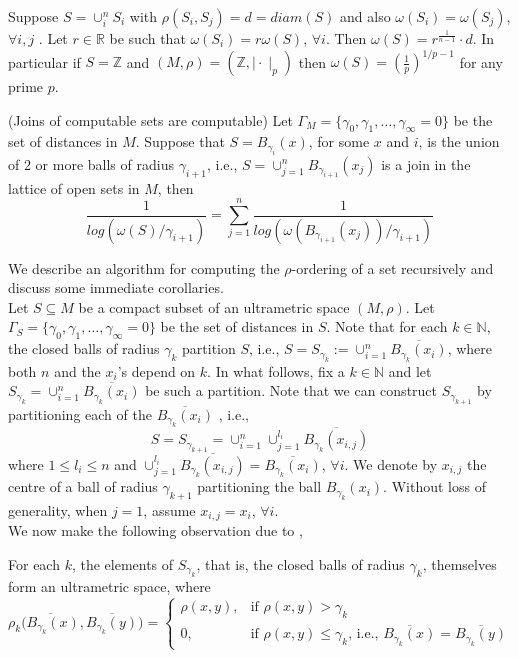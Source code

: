 \begin{corollary*}
	Suppose $S = \cup_i^n S_i$ with $\rho(S_i, S_j)=d=diam(S)$ and also $\omega(S_i)=\omega(S_j)$, $\forall i,j$ .  Let $r \in \mathbb{R}$ be such that $\omega(S_i)=r\omega(S)$, $\forall i$. Then $\omega(S) = r^{\frac{1}{n-1}}\cdot d$. In particular if $S = \mathbb{Z}$ and $(M,\rho)= (\mathbb{Z}, \mid \cdot\mid_p)$ then $\omega(S)=(\frac{1}{p})^{1/p-1}$ for any prime $p$. 
\end{corollary*}

\begin{corollary*}
	(Joins of computable sets are computable) Let  $\Gamma_M = \{\gamma_0, \gamma_1,\ldots, \gamma_\infty=0\}$ be the set of distances in $M$. Suppose that $S = B_{\gamma_i}(x)$,  for some $x$ and $i$, is the union of $2$ or more balls of radius $\gamma_{i+1}$, i.e., $S=\cup_{j=1}^n B_{\gamma_{i+1}} (x_j)$ is a join in the lattice of open sets in $M$, then 
	\[\frac{1}{log(\omega(S)/\gamma_{i+1} )} = \sum_{j=1}^n \frac{1}{log(\omega(B_{\gamma_{i+1}}(x_j))/\gamma_{i+1} )}\]
\end{corollary*}

We describe an algorithm for computing the $\rho$-ordering of a set recursively and discuss some immediate corollaries.  \\

Let $S \subseteq M$ be a compact subset of an ultrametric space $(M, \rho)$. Let $\Gamma_S =\{\gamma_0, \gamma_1,\ldots,\gamma_\infty=0\}$ be the set of distances in $S$.  Note that for each $k \in \mathbb{N}$, the closed balls of radius $\gamma_k$ partition $S$, i.e., $S=S_{\gamma_k} := \cup_{i=1}^n \overline{B_{\gamma_k}(x_i)}$, where both $n$ and the $x_i$'s depend on $k$. In what follows, fix a $k \in \mathbb{N}$ and let $S_{\gamma_k} = \cup_{i=1}^n \overline{B_{\gamma_k}(x_i)}$ be such a partition. Note that we can construct $S_{\gamma_{k+1}}$ by partitioning each of the $\overline{B_{\gamma_k}(x_i)}$ , i.e., \[S = S_{\gamma_{k+1}} = \cup_{i=1}^n \cup_{j=1}^{l_i} \overline{B_{\gamma_k}(x_{i,j})}\] where $1 \leq l_i \leq n$ and $\cup_{j=1}^{l_i} \overline{B_{\gamma_k}(x_{i,j})}=\overline{B_{\gamma_k}(x_i)}$, $\forall i$. We denote by $x_{i,j}$ the centre of a ball of radius $\gamma_{k+1}$ partitioning the ball $B_{\gamma_k}(x_i)$. Without loss of generality, when $j=1$, assume $x_{i,j}=x_i$, $\forall i$.\\

We now make the following observation due to \cite{na},

\begin{lemma*}
For each $k$, the elements of $S_{\gamma_k}$, that is, the closed balls of radius $\gamma_k$, themselves form an ultrametric space, where 
\[ \rho_k\overline{(B_{\gamma_k}(x)},\overline{B_{\gamma_k}(y)}) = 
\begin{cases}
\rho(x,y), & \text{if } \rho(x,y) > \gamma_k \\
0, & \text{if }   \rho(x,y) \leq \gamma_k \text{, i.e., } \overline{B_{\gamma_k}(x)}=\overline{B_{\gamma_k}(y)}
\end{cases}
\]
\end{lemma*}

